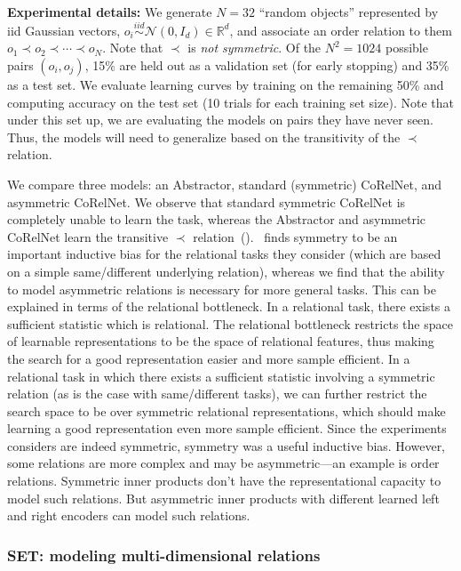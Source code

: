 \textbf{Experimental details:} We generate $N = 32$ ``random objects'' represented by iid Gaussian vectors, $o_i \overset{iid}{\sim} \mathcal{N}(0,
I_d) \in \mathbb{R}^d$, and associate an order relation to them $o_1 \prec o_2 \prec \cdots \prec o_N$. Note that $\prec$ is \textit{not symmetric}. Of the $N^2 = 1024$ possible pairs $(o_i, o_j)$, 15\% are held out as a validation set (for early stopping) and 35\% as a test set. We evaluate learning curves by training on the remaining 50\% and computing accuracy on the test set (10 trials for each training set size). Note that under this set up, we are evaluating the models on pairs they have never seen. Thus, the models will need to generalize based on the transitivity of the $\prec$ relation.

We compare three models: an Abstractor, standard (symmetric) CoRelNet, and asymmetric CoRelNet. We observe that standard symmetric CoRelNet is completely unable to learn the task, whereas the Abstractor and asymmetric CoRelNet learn the transitive $\prec$ relation~().~\citep{kerg2022neural} finds symmetry to be an important inductive bias for the relational tasks they consider (which are based on a simple same/different underlying relation), whereas we find that the ability to model asymmetric relations is necessary for more general tasks. This can be explained in terms of the relational bottleneck. In a relational task, there exists a sufficient statistic which is relational. The relational bottleneck restricts the space of learnable representations to be the space of relational features, thus making the search for a good representation easier and more sample efficient. In a relational task in which there exists a sufficient statistic involving a symmetric relation (as is the case with same/different tasks), we can further restrict the search space to be over symmetric relational representations, which should make learning a good representation even more sample efficient. Since the experiments \citep{kerg2022neural} considers are indeed symmetric, symmetry was a useful inductive bias. However, some relations are more complex and may be asymmetric---an example is order relations. Symmetric inner products don't have the representational capacity to model such relations. But asymmetric inner products with different learned left and right encoders can model such relations.

\subsubsection{SET: modeling multi-dimensional relations}

